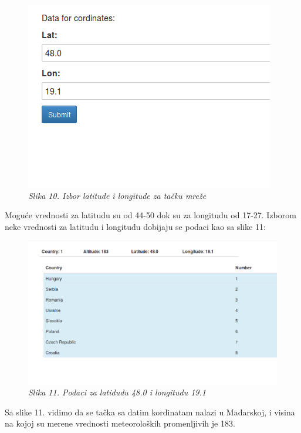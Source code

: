 \documentclass[12pt]{article}
\begin{document}
\begin{figure}[!htb]
	\centering
	\includegraphics[width=0.7\linewidth]{points.png}
	\caption*{\textsl{Slika 10. Izbor latitude i longitude za tačku mreže}}
\end{figure}

Moguće vrednosti za latitudu su od 44-50 dok su za longitudu od 17-27. Izborom neke vrednosti za latitudu i longitudu dobijaju se podaci kao sa slike 11:

\begin{figure}[!htb]
	\centering
	\includegraphics[width=0.7\linewidth]{data.png}
	\caption*{\textsl{Slika 11. Podaci za latidudu 48.0 i longitudu 19.1}}
\end{figure}
Sa slike 11. vidimo da se tačka sa datim kordinatam nalazi u Mađarskoj, i visina na kojoj su merene vrednosti meteoroloških promenljivih je 183.
\end{document}
